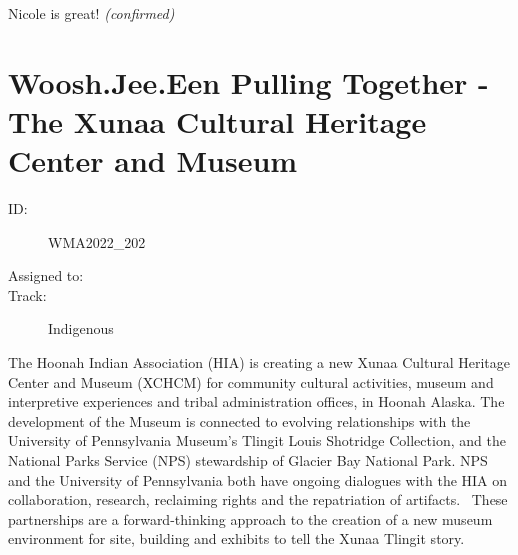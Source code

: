 \documentclass{report}
\begin{document}
                

                Nicole is great!
                \emph{ (confirmed) }
              

              
        
          \newpage
          \section{ Woosh.Jee.Een Pulling Together - The Xunaa Cultural Heritage Center and Museum }
            \begin{description}
              \item [ID:]
              WMA2022\_202

              \item [Assigned to:]
                \item [Track:]Indigenous~
              \end{description}

              The Hoonah Indian Association (HIA) is creating a new Xunaa Cultural Heritage Center and Museum (XCHCM) for community cultural activities, museum and interpretive experiences and tribal administration offices, in Hoonah Alaska. The development of the Museum is connected to evolving relationships with the University of Pennsylvania Museum’s Tlingit Louis Shotridge Collection, and the National Parks Service (NPS) stewardship of Glacier Bay National Park.
NPS and the University of Pennsylvania both have ongoing dialogues with the HIA on collaboration, research, reclaiming rights and the repatriation of artifacts.  These partnerships are a forward-thinking approach to the creation of a new museum environment for site, building and exhibits to tell the Xunaa Tlingit story. 
\end{document}
